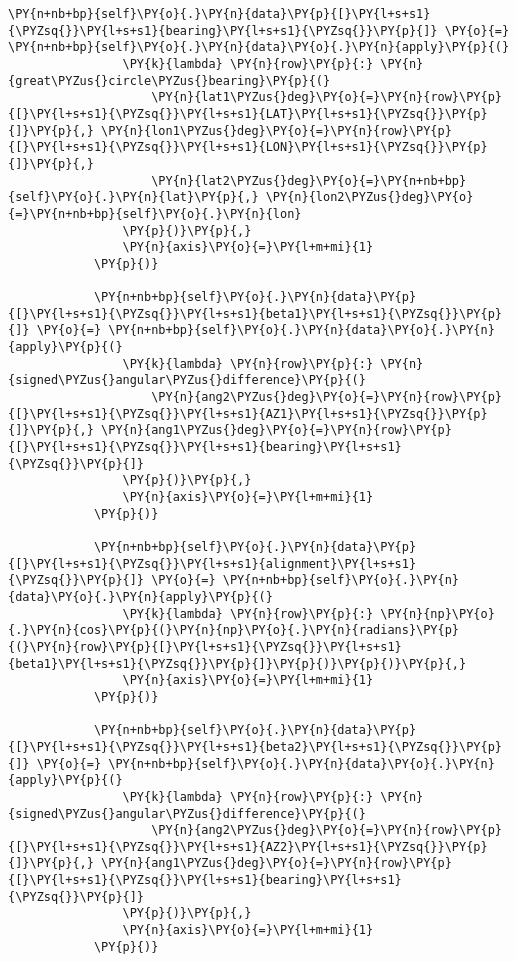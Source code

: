 \begin{tcolorbox}[breakable, size=fbox, boxrule=1pt, pad at break*=1mm,colback=cellbackground, colframe=cellborder]
\begin{Verbatim}[commandchars=\\\{\}]
            \PY{n+nb+bp}{self}\PY{o}{.}\PY{n}{data}\PY{p}{[}\PY{l+s+s1}{\PYZsq{}}\PY{l+s+s1}{bearing}\PY{l+s+s1}{\PYZsq{}}\PY{p}{]} \PY{o}{=} \PY{n+nb+bp}{self}\PY{o}{.}\PY{n}{data}\PY{o}{.}\PY{n}{apply}\PY{p}{(}
                \PY{k}{lambda} \PY{n}{row}\PY{p}{:} \PY{n}{great\PYZus{}circle\PYZus{}bearing}\PY{p}{(}
                    \PY{n}{lat1\PYZus{}deg}\PY{o}{=}\PY{n}{row}\PY{p}{[}\PY{l+s+s1}{\PYZsq{}}\PY{l+s+s1}{LAT}\PY{l+s+s1}{\PYZsq{}}\PY{p}{]}\PY{p}{,} \PY{n}{lon1\PYZus{}deg}\PY{o}{=}\PY{n}{row}\PY{p}{[}\PY{l+s+s1}{\PYZsq{}}\PY{l+s+s1}{LON}\PY{l+s+s1}{\PYZsq{}}\PY{p}{]}\PY{p}{,}
                    \PY{n}{lat2\PYZus{}deg}\PY{o}{=}\PY{n+nb+bp}{self}\PY{o}{.}\PY{n}{lat}\PY{p}{,} \PY{n}{lon2\PYZus{}deg}\PY{o}{=}\PY{n+nb+bp}{self}\PY{o}{.}\PY{n}{lon}
                \PY{p}{)}\PY{p}{,}
                \PY{n}{axis}\PY{o}{=}\PY{l+m+mi}{1}
            \PY{p}{)}
    
            \PY{n+nb+bp}{self}\PY{o}{.}\PY{n}{data}\PY{p}{[}\PY{l+s+s1}{\PYZsq{}}\PY{l+s+s1}{beta1}\PY{l+s+s1}{\PYZsq{}}\PY{p}{]} \PY{o}{=} \PY{n+nb+bp}{self}\PY{o}{.}\PY{n}{data}\PY{o}{.}\PY{n}{apply}\PY{p}{(}
                \PY{k}{lambda} \PY{n}{row}\PY{p}{:} \PY{n}{signed\PYZus{}angular\PYZus{}difference}\PY{p}{(}
                    \PY{n}{ang2\PYZus{}deg}\PY{o}{=}\PY{n}{row}\PY{p}{[}\PY{l+s+s1}{\PYZsq{}}\PY{l+s+s1}{AZ1}\PY{l+s+s1}{\PYZsq{}}\PY{p}{]}\PY{p}{,} \PY{n}{ang1\PYZus{}deg}\PY{o}{=}\PY{n}{row}\PY{p}{[}\PY{l+s+s1}{\PYZsq{}}\PY{l+s+s1}{bearing}\PY{l+s+s1}{\PYZsq{}}\PY{p}{]}
                \PY{p}{)}\PY{p}{,}
                \PY{n}{axis}\PY{o}{=}\PY{l+m+mi}{1}
            \PY{p}{)}
    
            \PY{n+nb+bp}{self}\PY{o}{.}\PY{n}{data}\PY{p}{[}\PY{l+s+s1}{\PYZsq{}}\PY{l+s+s1}{alignment}\PY{l+s+s1}{\PYZsq{}}\PY{p}{]} \PY{o}{=} \PY{n+nb+bp}{self}\PY{o}{.}\PY{n}{data}\PY{o}{.}\PY{n}{apply}\PY{p}{(}
                \PY{k}{lambda} \PY{n}{row}\PY{p}{:} \PY{n}{np}\PY{o}{.}\PY{n}{cos}\PY{p}{(}\PY{n}{np}\PY{o}{.}\PY{n}{radians}\PY{p}{(}\PY{n}{row}\PY{p}{[}\PY{l+s+s1}{\PYZsq{}}\PY{l+s+s1}{beta1}\PY{l+s+s1}{\PYZsq{}}\PY{p}{]}\PY{p}{)}\PY{p}{)}\PY{p}{,}
                \PY{n}{axis}\PY{o}{=}\PY{l+m+mi}{1}
            \PY{p}{)}
    
            \PY{n+nb+bp}{self}\PY{o}{.}\PY{n}{data}\PY{p}{[}\PY{l+s+s1}{\PYZsq{}}\PY{l+s+s1}{beta2}\PY{l+s+s1}{\PYZsq{}}\PY{p}{]} \PY{o}{=} \PY{n+nb+bp}{self}\PY{o}{.}\PY{n}{data}\PY{o}{.}\PY{n}{apply}\PY{p}{(}
                \PY{k}{lambda} \PY{n}{row}\PY{p}{:} \PY{n}{signed\PYZus{}angular\PYZus{}difference}\PY{p}{(}
                    \PY{n}{ang2\PYZus{}deg}\PY{o}{=}\PY{n}{row}\PY{p}{[}\PY{l+s+s1}{\PYZsq{}}\PY{l+s+s1}{AZ2}\PY{l+s+s1}{\PYZsq{}}\PY{p}{]}\PY{p}{,} \PY{n}{ang1\PYZus{}deg}\PY{o}{=}\PY{n}{row}\PY{p}{[}\PY{l+s+s1}{\PYZsq{}}\PY{l+s+s1}{bearing}\PY{l+s+s1}{\PYZsq{}}\PY{p}{]}
                \PY{p}{)}\PY{p}{,}
                \PY{n}{axis}\PY{o}{=}\PY{l+m+mi}{1}
            \PY{p}{)}
    

\end{Verbatim}
\end{tcolorbox}
